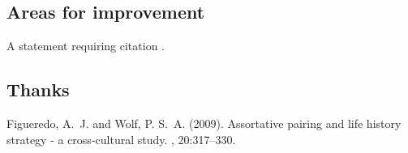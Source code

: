 \documentclass[twoside,twocolumn]{article}
\begin{document}
\subsection{Areas for improvement}

A statement requiring citation \cite{Figueredo:2009dg}.
\blindtext %

\subsection{Thanks}

\blindtext %


\begin{thebibliography}{99} %

Figueredo, A.~J. and Wolf, P. S.~A. (2009).
\newblock Assortative pairing and life history strategy - a cross-cultural
  study.
, 20:317--330.
 
\end{thebibliography}

\end{document}
